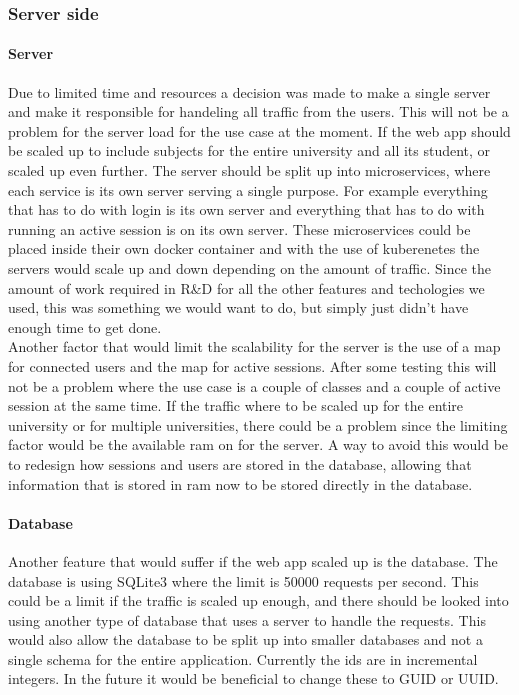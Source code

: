 \subsubsection{Server side}
\paragraph{Server}
Due to limited time and resources a decision was made to make a single server and make it responsible for handeling all traffic from the users. This will not be a problem for the server load for the use case at the moment. If the web app should be scaled up to include subjects for the entire university and all its student, or scaled up even further. The server should be split up into microservices, where each service is its own server serving a single purpose. For example everything that has to do with login is its own server and everything that has to do with running an active session is on its own server. These microservices could be placed inside their own docker container and with the use of kuberenetes the servers would scale up and down depending on the amount of traffic. Since the amount of work required in R\&D for all the other features and techologies we used, this was something we would want to do, but simply just didn't have enough time to get done.
\\[11pt]
Another factor that would limit the scalability for the server is the use of a map for connected users and the map for active sessions. After some testing this will not be a problem where the use case is a couple of classes and a couple of active session at the same time. If the traffic where to be scaled up for the entire university or for multiple universities, there could be a problem since the limiting factor would be the available ram on for the server. A way to avoid this would be to redesign how sessions and users are stored in the database, allowing that information that is stored in ram now to be stored directly in the database. 
\paragraph{Database}
Another feature that would suffer if the web app scaled up is the database. The database is using SQLite3 where the limit is 50000 requests per second\cite{SQLite:faqQ19}. This could be a limit if the traffic is scaled up enough, and there should be looked into using another type of database that uses a server to handle the requests. This would also allow the database to be split up into smaller databases and not a single schema for the entire application. Currently the ids are in incremental integers. In the future it would be beneficial to change these to GUID or UUID.\cite{UUIDE}